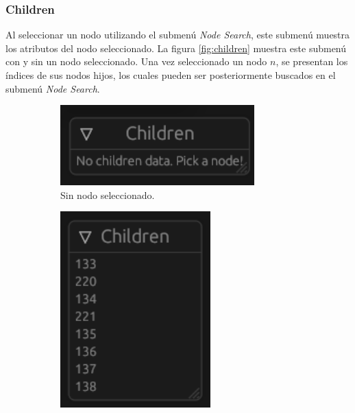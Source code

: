 \subsubsection{Children}

Al seleccionar un nodo utilizando el submenú \textit{Node Search}, este submenú muestra los atributos del nodo seleccionado. La figura \ref{fig:children} muestra este submenú con y sin un nodo seleccionado. Una vez seleccionado un nodo $n$, se presentan los índices de sus nodos hijos, los cuales pueden ser posteriormente buscados en el submenú \textit{Node Search}.

\begin{figure}[h]
    \begin{center}
    \begin{subfigure}{.49\textwidth}
        \includegraphics[width=\textwidth]{children-off.png}
        \caption{Sin nodo seleccionado.}
    \end{subfigure}
    \begin{subfigure}{.49\textwidth}
        \includegraphics[width=\textwidth]{children-on.png}

\end{subfigure}
\end{center}
\end{figure}
